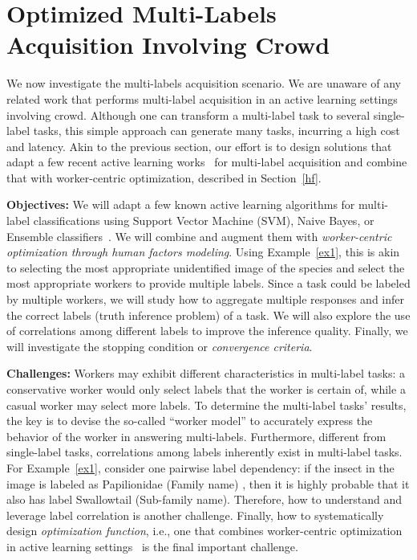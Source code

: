 \vspace{-0.2in}
\section{Optimized Multi-Labels Acquisition Involving Crowd}\label{unlab}
\vspace{-0.1in}
We now investigate the multi-labels acquisition scenario. We are unaware of any related work that performs multi-label acquisition in an active learning settings involving crowd. Although one can transform a multi-label task to several single-label tasks, this simple approach can generate many tasks, incurring a
high cost and latency. Akin to the previous section, our effort is to design solutions that adapt a few recent active learning works~\cite{multi0,multi1,multi2,multi3} for multi-label acquisition and combine that with worker-centric optimization, described in Section~\ref{hf}.

{\bf Objectives:} We will adapt a few known active learning algorithms for multi-label classifications using Support Vector Machine (SVM), Naive Bayes, or Ensemble classifiers~\cite{multi0,multi1,multi2,multi3}. We will combine and augment them with {\em worker-centric optimization through human factors modeling}. Using Example~\ref{ex1}, this is akin to selecting the most appropriate unidentified image of the species and select the most appropriate workers to provide multiple labels. Since a task could be labeled by multiple workers, we will study how to aggregate multiple responses and infer the correct labels (truth inference problem) of a task. We will also explore the use of correlations among different labels to improve the inference quality. Finally, we will investigate the stopping condition or {\em convergence criteria}. 



{\bf Challenges:} Workers may exhibit different characteristics in multi-label tasks: a conservative worker would only select labels that the worker is certain of, while a casual worker may select more labels. To determine the multi-label tasks’ results, the key is to
devise the so-called ``worker model'' to accurately express the behavior of the worker in answering multi-labels. Furthermore, different from single-label tasks, correlations among labels inherently exist in multi-label tasks. For Example~\ref{ex1}, consider one pairwise label dependency: if the insect in the image is labeled as Papilionidae (Family name) , then it is highly probable that it also has label
Swallowtail (Sub-family name). Therefore, how to understand and leverage label correlation is another challenge. Finally, how to systematically design {\em optimization function}, i.e., one that combines worker-centric optimization in active learning settings~\cite{multi0,multi1,multi2,multi3} is the final important challenge.


